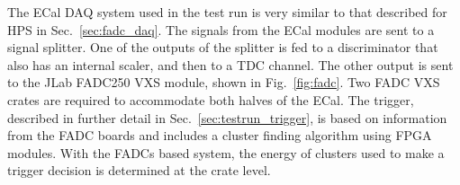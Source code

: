 The ECal DAQ system used in the test run is very similar to that described for HPS in Sec.~\ref{sec:fadc_daq}. 
The signals from the ECal modules are sent to a signal splitter. One of the outputs of the splitter is fed to a 
discriminator that also has an internal scaler, and then to a TDC channel. The other output is sent to the 
JLab FADC250 VXS module, shown in Fig.~\ref{fig:fadc}. Two FADC VXS crates are required to 
accommodate both halves of the ECal. The trigger, described in further detail in 
Sec.~\ref{sec:testrun_trigger}, is based on information from the FADC boards and includes a cluster 
finding algorithm using FPGA modules. With the FADCs based system, the energy of clusters used to 
make a trigger decision is determined at the crate level. 
